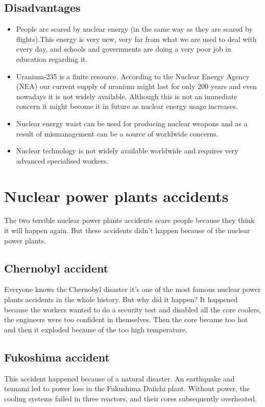 \documentclass{article}
\begin{document}
\subsection{Disadvantages}
\begin{itemize}
    \item People are scared by nuclear energy (in the same way as they are scared by flights).This energy is very new, very far from what we are used to deal with every day,  and schools and governments are doing a very poor job in education regarding it.

    \item Uranium-235 is a finite resource. According to the Nuclear Energy Agency (NEA) our current supply of uranium might last for only 200 years and even nowadays it is not widely available. Although this is not an immediate concern it might become it in future as nuclear energy usage increases.
    \item Nuclear energy waist can be used for producing nuclear weapons and as a result of mismanagement can be a source of worldwide concerns.
    \item Nuclear technology is not widely available worldwide and requires very advanced specialised workers.
    
\end{itemize}
\section{Nuclear power plants accidents}
The two terrible nuclear power plants accidents scare people because they think it will happen again.
But these accidents didn't happen because of the nuclear power plants.
\subsection{Chernobyl accident}
Everyone knows the Chernobyl disaster it's one of the most famous nuclear power plants accidents in the whole history. But why did it happen? It happened because the workers wanted to do a security test and disabled all the core coolers, the engineers were too confident in themselves. Then the core became too hot and then it exploded because of the too high temperature.
\subsection{Fukoshima accident}
This accident happened because of a natural disaster. An earthquake and tsunami led to power loss in the Fukushima Daiichi plant. Without power, the cooling systems failed in three reactors, and their cores subsequently overheated.
\end{document}
